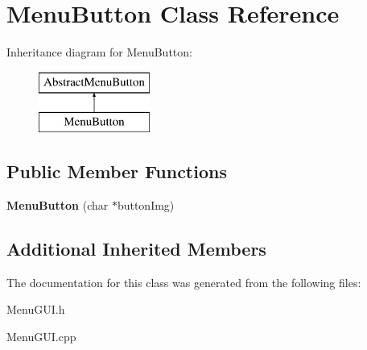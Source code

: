 \hypertarget{class_menu_button}{\section{Menu\-Button Class Reference}
\label{class_menu_button}
}
Inheritance diagram for Menu\-Button\-:\begin{figure}[H]
\begin{center}
\leavevmode
\includegraphics[height=2.000000cm]{class_menu_button}
\end{center}
\end{figure}
\subsection*{Public Member Functions}
\begin{DoxyCompactItemize}
\item 
\hypertarget{class_menu_button_a5745065c9b9b5a524d5989601e6456a8}{{\bfseries Menu\-Button} (char $\ast$button\-Img)}\label{class_menu_button_a5745065c9b9b5a524d5989601e6456a8}

\end{DoxyCompactItemize}
\subsection*{Additional Inherited Members}


The documentation for this class was generated from the following files\-:\begin{DoxyCompactItemize}
\item 
Menu\-G\-U\-I.\-h\item 
Menu\-G\-U\-I.\-cpp\end{DoxyCompactItemize}
